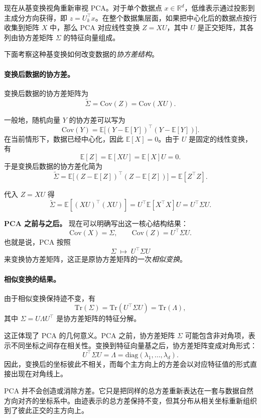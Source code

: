 现在从基变换视角重新审视 PCA。对于单个数据点 \(x\in\mathbb{R}^d\)，低维表示通过投影到主成分方向获得，即 \(z=U_k^\top x\)。在整个数据集层面，如果把中心化后的数据点按行收集到矩阵 \(X\) 中，那么 PCA 对应线性变换 \(Z=XU\)，其中 \(U\) 是正交矩阵，其各列由协方差矩阵 \(\Sigma\) 的特征向量组成。

\medskip
\noindent
下面考察这种基变换如何改变数据的\emph{协方差结构}。

\paragraph{变换后数据的协方差。}
变换后数据的协方差矩阵为
\[
\tilde{\Sigma} = \mathrm{Cov}(Z)=\mathrm{Cov}(XU).
\]

一般地，随机向量 \(Y\) 的协方差可以写为
\[
\mathrm{Cov}(Y)
=\mathbb{E}\big[(Y-\mathbb{E}[Y])^\top(Y-\mathbb{E}[Y])\big].
\]
在当前情形下，数据已经中心化，因此 \(\mathbb{E}[X]=0\)。由于 \(U\) 是固定的线性变换，有
\[
\mathbb{E}[Z]=\mathbb{E}[XU]=\mathbb{E}[X]U=0.
\]
于是变换后数据的协方差化简为
\[
\tilde{\Sigma}
=\mathbb{E}\big[(Z-\mathbb{E}[Z])^\top(Z-\mathbb{E}[Z])\big]
=\mathbb{E}[Z^\top Z].
\]

代入 \(Z=XU\) 得
\[
\tilde{\Sigma}
=\mathbb{E}[(XU)^\top(XU)]
=U^\top\mathbb{E}[X^\top X]U
=U^\top\Sigma U.
\]

\medskip
\noindent
\textbf{PCA 之前与之后。}
现在可以明确写出这一核心结构结果：
\[
\mathrm{Cov}(X)=\Sigma,
\qquad
\mathrm{Cov}(Z)=U^\top\Sigma U.
\]
也就是说，PCA 按照
\[
\Sigma\;\longmapsto\;U^\top\Sigma U
\]
来变换协方差矩阵，这正是原协方差矩阵的一次\emph{相似变换}。

\paragraph{相似变换的结果。}
由于相似变换保持迹不变，有
\[
\mathrm{Tr}(\Sigma)
=
\mathrm{Tr}(U^\top\Sigma U)
=
\mathrm{Tr}(\Lambda),
\]
其中 \(\Sigma=U\Lambda U^\top\) 是协方差矩阵的特征分解。

这正体现了 PCA 的几何意义。PCA 之前，协方差矩阵 \(\Sigma\) 可能包含非对角项，表示不同坐标之间存在相关性。变换到特征向量基之后，协方差矩阵变成对角形式：
\[
U^\top\Sigma U
=
\Lambda
=
\mathrm{diag}(\lambda_1,\ldots,\lambda_d).
\]
因此，变换后的坐标彼此不相关，而每个主方向上的方差会以对应特征值的形式直接出现在对角线上。

PCA 并不会创造或消除方差。它只是把同样的总方差重新表达在一套与数据自然方向对齐的坐标系中。由迹表示的总方差保持不变，但其分布从相关坐标重新组织到了彼此正交的主方向上。


